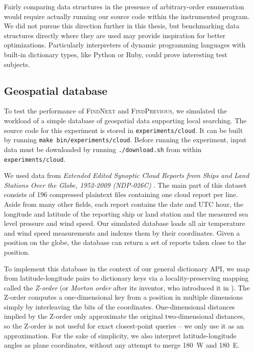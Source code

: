 Fairly comparing data structures in the presence of arbitrary-order enumeration
would require actually running our source code within the instrumented program.
We did not pursue this direction further in this thesis, but benchmarking data
structures directly where they are used may provide inspiration for better
optimizations. Particularly interpreters of dynamic programming languages
with built-in dictionary types, like Python or Ruby, could prove interesting
test subjects.

\subsection{Geospatial database}
To test the performance of \textsc{FindNext} and \textsc{FindPrevious}, we
simulated the workload of a simple database of geospatial data supporting
local searching. The source code for this experiment is stored in
\texttt{experiments/cloud}. It can be built by running \texttt{make
bin/experiments/cloud}. Before running the experiment, input data must
be downloaded by running \texttt{./download.sh} from within
\texttt{experiments/cloud}.

We used data from \emph{Extended Edited Synoptic Cloud Reports from Ships and
Land Stations Over the Globe, 1952-2009 (NDP-026C)} \cite{cloud-reports}.
The main part of this dataset consists of 196 compressed plaintext files
containing one cloud report per line. Aside from many other fields,
each report contains the date and UTC hour, the longitude and latitude of the
reporting ship or land station and the measured sea level pressure and
wind speed.
Our simulated database loads all air temperature and wind speed measurements
and indexes them by their coordinates. Given a position on the globe, the
database can return a set of reports taken close to the position.

To implement this database in the context of our general dictionary API,
we map from latitude-longitude pairs to dictionary keys via a
locality-preserving mapping called the \emph{Z-order} (or
\emph{Morton order} after its inventor, who introduced it in
\cite{morton-order}). The Z-order computes a one-dimensional key from
a position in multiple dimensions simply by interleaving the bits of
the coordinates. One-dimensional distances implied by the Z-order only
approximate the original two-dimensional distances, so the Z-order is
not useful for exact closest-point queries -- we only use it as an
approximation. For the sake of simplicity, we also interpret
latitude-longitude angles as plane coordinates, without any attempt
to merge 180\textdegree~W and 180\textdegree~E.

